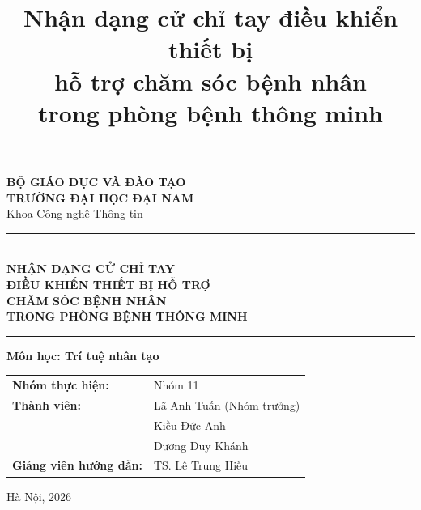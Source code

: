 \documentclass[conference]{IEEEtran}
\begin{document}
\begin{titlepage}
\begin{center}

\vspace*{0.5cm}

{\large\bfseries BỘ GIÁO DỤC VÀ ĐÀO TẠO}\\[0.2cm]
{\large\bfseries TRƯỜNG ĐẠI HỌC ĐẠI NAM}\\[0.3cm]
{\large Khoa Công nghệ Thông tin}

\vspace{1.5cm}

\rule{\linewidth}{0.5pt}\\[0.4cm]
{\LARGE\bfseries NHẬN DẠNG CỬ CHỈ TAY\\[0.3cm]
ĐIỀU KHIỂN THIẾT BỊ HỖ TRỢ\\[0.3cm]
CHĂM SÓC BỆNH NHÂN\\[0.3cm]
TRONG PHÒNG BỆNH THÔNG MINH}\\[0.4cm]
\rule{\linewidth}{0.5pt}

\vspace{1cm}

{\large\bfseries Môn học: Trí tuệ nhân tạo}

\vspace{1cm}

{\large
\begin{tabular}{ll}
\textbf{Nhóm thực hiện:} & Nhóm 11 \\
\textbf{Thành viên:} & Lã Anh Tuấn (Nhóm trưởng) \\
 & Kiều Đức Anh \\
 & Dương Duy Khánh \\
\textbf{Giảng viên hướng dẫn:} & TS. Lê Trung Hiếu \\
\end{tabular}
}

\vspace{1cm}

{\large Hà Nội, 2026}

\end{center}
\end{titlepage}

\title{Nhận dạng cử chỉ tay điều khiển thiết bị\\hỗ trợ chăm sóc bệnh nhân\\trong phòng bệnh thông minh}

\author{
}
\end{document}
